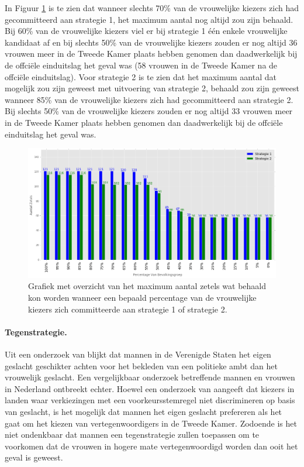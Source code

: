 In Figuur \ref{fig:PerV} is te zien dat wanneer slechts 70\% van de vrouwelijke kiezers zich had gecommitteerd aan strategie 1, het maximum aantal nog altijd zou zijn behaald. Bij 60\% van de vrouwelijke kiezers viel er bij strategie 1 één enkele vrouwelijke kandidaat af en bij slechts 50\% van de vrouwelijke kiezers zouden er nog altijd 36 vrouwen meer in de Tweede Kamer plaats hebben genomen dan daadwerkelijk bij de offci\"{e}le einduitslag het geval was (58 vrouwen in de Tweede Kamer na de offci\"{e}le einduitslag). Voor strategie 2 is te zien dat het maximum aantal dat mogelijk zou zijn geweest met uitvoering van strategie 2, behaald zou zijn geweest wanneer 85\% van de vrouwelijke kiezers zich had gecommitteerd aan strategie 2. Bij slechts 50\% van de vrouwelijke kiezers zouden er nog altijd 33 vrouwen meer in de Tweede Kamer plaats hebben genomen dan daadwerkelijk bij de offci\"{e}le einduitslag het geval was.

\begin{figure}[H]


	\includegraphics[width=\linewidth]{percentages_van_vrouwenS1S2.png}

			\caption{Grafiek met overzicht van het maximum aantal zetels wat behaald kon worden wanneer een bepaald percentage van de vrouwelijke kiezers zich committeerde aan strategie 1 of strategie 2.}

\label{fig:PerV}
\end{figure}






\paragraph{Tegenstrategie.}
Uit een onderzoek van \cite{lawless2012men} blijkt dat mannen in de Verenigde Staten het eigen geslacht geschikter achten voor het bekleden van een politieke ambt dan het vrouwelijk geslacht. Een vergelijkbaar onderzoek betreffende mannen en vrouwen in Nederland ontbreekt echter. Hoewel een onderzoek van \cite{mcelroy2009candidate} aangeeft dat kiezers in landen waar verkiezingen met een voorkeursstemregel niet discrimineren op basis van geslacht, is het mogelijk dat mannen het eigen geslacht prefereren als het gaat om het kiezen van vertegenwoordigers in de Tweede Kamer. Zodoende is het niet ondenkbaar dat mannen een tegenstrategie zullen toepassen om te voorkomen dat de vrouwen in hogere mate vertegenwoordigd worden dan ooit het geval is geweest. 

